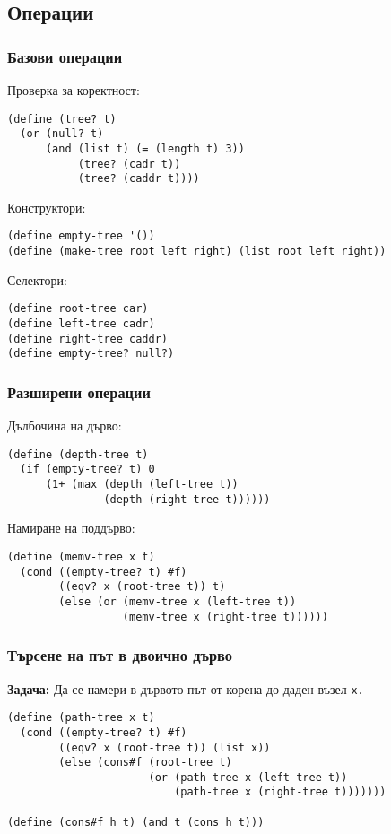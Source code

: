 \documentclass[alsotrans]{beamerswitch}
\begin{document}
\subsection{Операции}

\begin{frame}[fragile]
  \frametitle{Базови операции}

  Проверка за коректност:
  \pause
\begin{lstlisting}
(define (tree? t)
  (or (null? t)
      (and (list t) (= (length t) 3))
           (tree? (cadr t))
           (tree? (caddr t))))
\end{lstlisting}
  \pause
  Конструктори:
  \pause
\begin{lstlisting}
(define empty-tree '())
(define (make-tree root left right) (list root left right))
\end{lstlisting}
  \pause
  Селектори:
  \pause
\begin{lstlisting}
(define root-tree car)
(define left-tree cadr)
(define right-tree caddr)
(define empty-tree? null?)
\end{lstlisting}
\end{frame}

\begin{frame}[fragile]
  \frametitle{Разширени операции}

  Дълбочина на дърво:
  \pause
\begin{lstlisting}
(define (depth-tree t)
  (if (empty-tree? t) 0
      (1+ (max (depth (left-tree t))
               (depth (right-tree t))))))
\end{lstlisting}
  \pause
  Намиране на поддърво:
  \pause
\begin{lstlisting}
(define (memv-tree x t)
  (cond ((empty-tree? t) #f)
        ((eqv? x (root-tree t)) t)
        (else (or (memv-tree x (left-tree t))
                  (memv-tree x (right-tree t))))))
\end{lstlisting}
\end{frame}

\begin{frame}[fragile]
  \frametitle{Търсене на път в двоично дърво}

  \textbf{Задача:} Да се намери в дървото път от корена до даден възел \tt x.
  \pause
\begin{lstlisting}
(define (path-tree x t)
  (cond ((empty-tree? t) #f)
        ((eqv? x (root-tree t)) (list x))
        (else (cons#f (root-tree t)
                      (or (path-tree x (left-tree t))
                          (path-tree x (right-tree t)))))))

(define (cons#f h t) (and t (cons h t)))
\end{lstlisting}
\end{frame}
\end{document}
